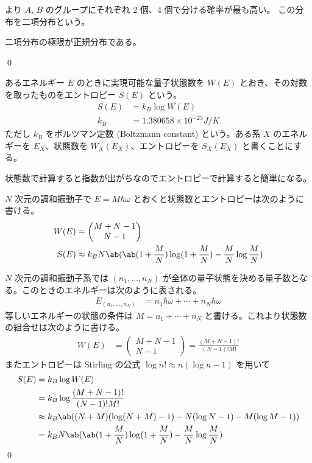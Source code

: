 \documentclass[uplatex,diffipdfmx,a4paper,11pt]{jlreq}
\makeatletter
\newcommand\mqty[1]{\begin{pmatrix}#1\end{pmatrix}}
\numberwithin{equation}{section}
\theoremstyle{definition}
\renewenvironment{proof}[1][\proofname]{\par
  \normalfont
  \topsep6\p@\@plus6\p@ \trivlist
  \item[\hskip\labelsep{\bfseries #1}\@addpunct{\bfseries}]\ignorespaces\quad\par
}{%
  \qed\endtrivlist\@endpefalse
}
\renewcommand\proofname{証明}
\makeatother
\begin{document}
より $A$, $B$ のグループにそれぞれ 2 個、4 個で分ける確率が最も高い。
この分布を二項分布という。

\begin{proposition}
  二項分布の極限が正規分布である。
\end{proposition}
\begin{proof}
\end{proof}

\begin{definition}
  あるエネルギー $E$ のときに実現可能な量子状態数を $W(E)$ とおき、その対数を取ったものをエントロピー $S(E)$ という。
  \begin{align}
    S(E) & = k_B\log W(E)                     \\
    k_B  & = 1.380658\times 10^{-23} \si{J/K}
  \end{align}
  ただし $k_B$ をボルツマン定数 (Boltzmann constant) という。ある系 $X$ のエネルギーを $E_X$、状態数を $W_X(E_X)$、エントロピーを $S_X(E_X)$ と書くことにする。
\end{definition}
状態数で計算すると指数が出がちなのでエントロピーで計算すると簡単になる。

\begin{theorem}
  $N$ 次元の調和振動子で $E = M\hbar\omega$ とおくと状態数とエントロピーは次のように書ける。
  \begin{align}
    W(E) & = \mqty{M + N - 1                                                                       \\ N - 1} \\
    S(E) & \approx k_BN\ab(\ab(1 + \frac{M}{N})\log(1 + \frac{M}{N}) - \frac{M}{N}\log\frac{M}{N})
  \end{align}
\end{theorem}
\begin{proof}
  $N$ 次元の調和振動子系では $(n_1,\ldots,n_N)$ が全体の量子状態を決める量子数となる。このときのエネルギーは次のように表される。
  \begin{align}
    E_{(n_1,\ldots,n_N)} & = n_1\hbar\omega + \cdots + n_N\hbar\omega
  \end{align}
  等しいエネルギーの状態の条件は $M = n_1 + \cdots + n_N$ と書ける。これより状態数の組合せは次のように書ける。
  \begin{align}
    W(E) & = \mqty{M + N - 1 \\ N - 1} = \frac{(M + N - 1)!}{(N - 1)!M!}
  \end{align}
  またエントロピーは Stirling の公式 $\log n! \approx n(\log n - 1)$ を用いて
  \begin{align}
    S(E) & = k_B\log W(E)                                                                    \\
         & = k_B\log\frac{(M + N - 1)!}{(N - 1)!M!}                                          \\
         & \approx k_B\ab((N + M)(\log(N + M) - 1) - N(\log N - 1) - M(\log M - 1))          \\
         & = k_BN\ab(\ab(1 + \frac{M}{N})\log(1 + \frac{M}{N}) - \frac{M}{N}\log\frac{M}{N})
  \end{align}
\end{proof}
\end{document}

